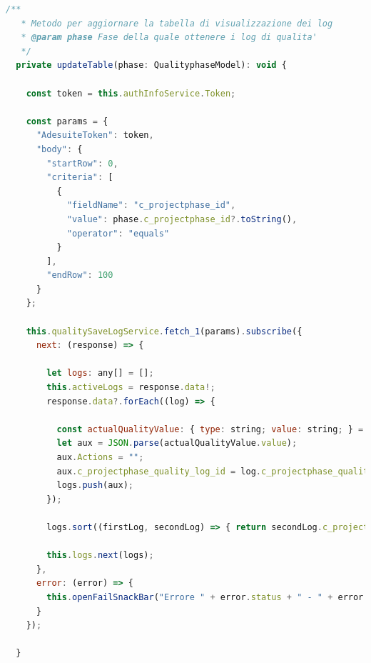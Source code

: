 \begin{lstlisting}[language=JavaScript, caption={Aggiornamento della tabella di visualizzazione dei dati di controllo qualità}]
  /**
   * Metodo per aggiornare la tabella di visualizzazione dei log
   * @param phase Fase della quale ottenere i log di qualita'
   */
  private updateTable(phase: QualityphaseModel): void {

    const token = this.authInfoService.Token;

    const params = {
      "AdesuiteToken": token,
      "body": {
        "startRow": 0,
        "criteria": [
          {
            "fieldName": "c_projectphase_id",
            "value": phase.c_projectphase_id?.toString(),
            "operator": "equals"
          }
        ],
        "endRow": 100
      }
    };

    this.qualitySaveLogService.fetch_1(params).subscribe({
      next: (response) => {

        let logs: any[] = [];
        this.activeLogs = response.data!;
        response.data?.forEach((log) => {

          const actualQualityValue: { type: string; value: string; } = log.qualityvalue! as any;
          let aux = JSON.parse(actualQualityValue.value);
          aux.Actions = "";
          aux.c_projectphase_quality_log_id = log.c_projectphase_quality_log_id;
          logs.push(aux);
        });

        logs.sort((firstLog, secondLog) => { return secondLog.c_projectphase_quality_log_id - firstLog.c_projectphase_quality_log_id })

        this.logs.next(logs);
      },
      error: (error) => {
        this.openFailSnackBar("Errore " + error.status + " - " + error.error.description, "X");
      }
    });

  }

\end{lstlisting}



